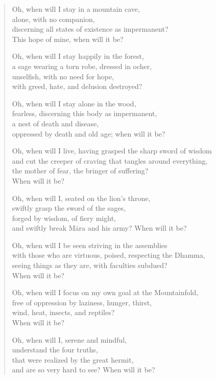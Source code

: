 \documentclass[12pt,openany]{book}%
\begin{document}
\begin{verse}%
Oh, when will I stay in a mountain cave, \\
alone, with no companion, \\
discerning all states of existence as impermanent? \\
This hope of mine, when will it be? 

Oh, when will I stay happily in the forest, \\
a sage wearing a torn robe, dressed in ocher, \\
unselfish, with no need for hope, \\
with greed, hate, and delusion destroyed? 

Oh, when will I stay alone in the wood, \\
fearless, discerning this body as impermanent, \\
a nest of death and disease, \\
oppressed by death and old age; when will it be? 

Oh, when will I live, having grasped the sharp sword of wisdom \\
and cut the creeper of craving that tangles around everything, \\
the mother of fear, the bringer of suffering? \\
When will it be? 

Oh, when will I, seated on the lion’s throne, \\
swiftly grasp the sword of the sages, \\
forged by wisdom, of fiery might, \\
and swiftly break \textsanskrit{Māra} and his army? When will it be? 

Oh, when will I be seen striving in the assemblies \\
with those who are virtuous, poised, respecting the Dhamma, \\
seeing things as they are, with faculties subdued? \\
When will it be? 

Oh, when will I focus on my own goal at the Mountainfold, \\
free of oppression by laziness, hunger, thirst, \\
wind, heat, insects, and reptiles? \\
When will it be? 

Oh, when will I, serene and mindful, \\
understand the four truths, \\
that were realized by the great hermit, \\
and are so very hard to see? When will it be? 


\end{verse}
\end{document}
